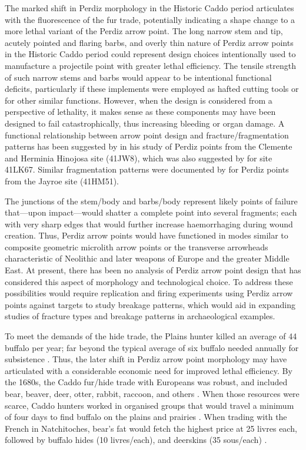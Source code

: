 \documentclass[review]{elsarticle}
\begin{document}
The marked shift in Perdiz morphology in the Historic Caddo period articulates with the fluorescence of the fur trade, potentially indicating a shape change to a more lethal variant of the Perdiz arrow point. The long narrow stem and tip, acutely pointed and flaring barbs, and overly thin nature of Perdiz arrow points in the Historic Caddo period could represent design choices intentionally used to manufacture a projectile point with greater lethal efficiency. The tensile strength of such narrow stems and barbs would appear to be intentional functional deficits, particularly if these implements were employed as hafted cutting tools or for other similar functions. However, when the design is considered from a perspective of lethality, it makes sense as these components may have been designed to fail catastrophically, thus increasing bleeding or organ damage. A functional relationship between arrow point design and fracture/fragmentation patterns has been suggested by \citet{RN9008} in his study of Perdiz points from the Clemente and Herminia Hinojosa site (41JW8), which was also suggested by \citet{RN9009} for site 41LK67. Similar fragmentation patterns were documented by \citet{RN8999} for Perdiz points from the Jayroe site (41HM51).

The junctions of the stem/body and barbs/body represent likely points of failure that---upon impact---would shatter a complete point into several fragments; each with very sharp edges that would further increase haemorrhaging during wound creation. Thus, Perdiz arrow points would have functioned in modes similar to composite geometric microlith arrow points or the transverse arrowheads characteristic of Neolithic and later weapons of Europe and the greater Middle East. At present, there has been no analysis of Perdiz arrow point design that has considered this aspect of morphology and technological choice. To address these possibilities would require replication and firing experiments using Perdiz arrow points against targets to study breakage patterns, which would aid in expanding studies of fracture types and breakage patterns in archaeological examples.

To meet the demands of the hide trade, the Plains hunter killed an average of 44 buffalo per year; far beyond the typical average of six buffalo needed annually for subsistence \citep{RN39}. Thus, the later shift in Perdiz arrow point morphology may have articulated with a considerable economic need for improved lethal efficiency. By the 1680s, the Caddo fur/hide trade with Europeans was robust, and included bear, beaver, deer, otter, rabbit, raccoon, and others \citep{RN9005,RN39,RN8076}. When those resources were scarce, Caddo hunters worked in organised groups that would travel a minimum of four days to find buffalo on the plains and prairies \citep{RN9005,RN38}. When trading with the French in Natchitoches, bear's fat would fetch the highest price at 25 livres each, followed by buffalo hides (10 livres/each), and deerskins (35 sous/each) \citep{RN9005}.
\end{document}
